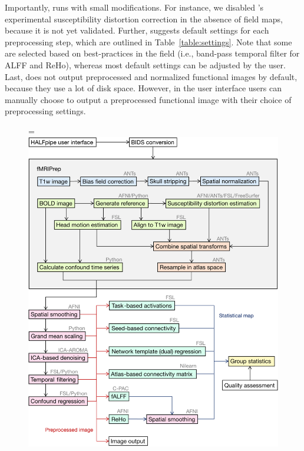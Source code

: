 Importantly,  runs  with small modifications. For instance, we disabled ’s experimental susceptibility distortion correction in the absence of field maps, because it is not yet validated. Further,  suggests default settings for each preprocessing step, which are outlined in Table~\ref{table:settings}. Note that some are selected based on best-practices in the field (i.e., band-pass temporal filter for ALFF and ReHo), whereas most default settings can be adjusted by the user. Last,  does not output preprocessed and normalized functional images by default, because they use a lot of disk space. However, in the user interface users can manually choose to output a preprocessed functional image with their choice of preprocessing settings.

\begin{figure}[!tb]
    \begin{adjustwidth}{-1cm}{}
        \hsize=\linewidth%
        \includegraphics[width=\linewidth]{fig/workflow/workflow-crop}

\end{adjustwidth}
\end{figure}
